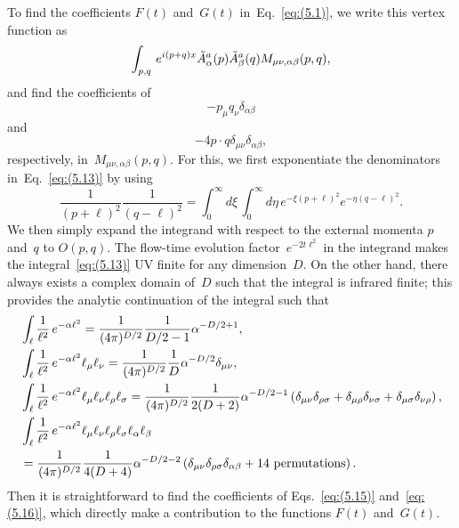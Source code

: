 To find the coefficients $F(t)$ and~$G(t)$ in~Eq.~\eqref{eq:(5.1)}, we write
this vertex function as
\begin{equation}
   \int_{p,q}\,e^{i(p+q)x}\Tilde{A}_\alpha^a(p)\Tilde{A}_\beta^a(q)
   M_{\mu\nu,\alpha\beta}(p,q),
\label{eq:(5.14)}
\end{equation}
and find the coefficients of
\begin{equation}
   -p_\mu q_\nu\delta_{\alpha\beta}
\label{eq:(5.15)}
\end{equation}
and
\begin{equation}
   -4p\cdot q\delta_{\mu\nu}\delta_{\alpha\beta},
\label{eq:(5.16)}
\end{equation}
respectively, in~$M_{\mu\nu,\alpha\beta}(p,q)$. For this, we first exponentiate
the denominators in~Eq.~\eqref{eq:(5.13)} by using
\begin{equation}
   \frac{1}{(p+\ell)^2}\frac{1}{(q-\ell)^2}
   =\int_0^\infty d\xi\,\int_0^\infty d\eta\,e^{-\xi(p+\ell)^2}e^{-\eta(q-\ell)^2}.
\label{eq:(5.17)}
\end{equation}
We then simply expand the integrand with respect to the external momenta $p$
and~$q$ to $O(p,q)$. The flow-time evolution factor~$e^{-2t\ell^2}$ in the
integrand makes the integral~\eqref{eq:(5.13)} UV finite for any dimension~$D$.
On the other hand, there always exists a complex domain of~$D$ such that the
integral is infrared finite; this provides the analytic continuation of the
integral such that
\begin{align}
   &\int_\ell\frac{1}{\ell^2}\,
   e^{-\alpha\ell^2}=\frac{1}{(4\pi)^{D/2}}\frac{1}{D/2-1}\alpha^{-D/2+1},
\label{eq:(5.18)}
\\
   &\int_\ell\frac{1}{\ell^2}\,e^{-\alpha\ell^2}\ell_\mu\ell_\nu
   =\frac{1}{(4\pi)^{D/2}}\frac{1}{D}\alpha^{-D/2}\delta_{\mu\nu},
\label{eq:(5.19)}
\\
   &\int_\ell\frac{1}{\ell^2}\,e^{-\alpha\ell^2}
   \ell_\mu\ell_\nu\ell_\rho\ell_\sigma
   =\frac{1}{(4\pi)^{D/2}}\frac{1}{2(D+2)}\alpha^{-D/2-1}
   \left(
   \delta_{\mu\nu}\delta_{\rho\sigma}
   +\delta_{\mu\rho}\delta_{\nu\sigma}
   +\delta_{\mu\sigma}\delta_{\nu\rho}
   \right),
\label{eq:(5.20)}
\\
   &\int_\ell\frac{1}{\ell^2}\,e^{-\alpha\ell^2}
   \ell_\mu\ell_\nu\ell_\rho\ell_\sigma\ell_\alpha\ell_\beta
\notag\\
   &=\frac{1}{(4\pi)^{D/2}}\frac{1}{4(D+4)}\alpha^{-D/2-2}
   \left(
   \delta_{\mu\nu}\delta_{\rho\sigma}\delta_{\alpha\beta}
   +\text{$14$ permutations}\right).
\label{eq:(5.21)}
\end{align}
Then it is straightforward to find the coefficients of Eqs.~\eqref{eq:(5.15)}
and~\eqref{eq:(5.16)}, which directly make a contribution to the functions
$F(t)$ and~$G(t)$.

